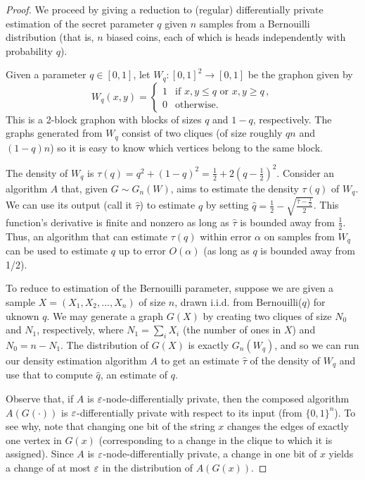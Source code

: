 \begin{proof} We proceed by giving a reduction to (regular)
  differentially private estimation of the secret parameter $q$ given
  $n$ samples from a Bernouilli distribution (that is, $n$ biased
  coins, each of which is heads independently with probability $q$). 

  Given a parameter $q\in [0,1]$, let $W_q:[0,1]^2\to [0,1]$ be the
  graphon given by 
  $$W_q(x,y) =
  \begin{cases}
    1 & \text{if } x, y \leq q \text{ or } x,y \geq q\, , \\
    0 & \text{otherwise.}
  \end{cases}$$
  This is a 2-block graphon with blocks of sizes $q$ and $1-q$,
  respectively. The graphs generated from $W_q$ consist of two
  cliques (of size roughly $qn$ and $(1-q)n$) so it is easy to know
  which vertices belong to the same block. 

  The density of $W_q$ is $\tau(q)= 
  q^2+ (1-q)^2 = \frac 1 2 + 2 (q-\frac 1 2)^2$. Consider an
  algorithm $A$ that, given $G\sim G_n(W)$, aims to estimate the density $\tau(q)$
  of $W_q$. We can use its output (call it $\hat \tau$) to estimate $q$ by
  setting $\hat q = \frac 1 2 - \sqrt{\frac{\hat \tau - \frac 1
      2}{2}}$. This function's derivative is finite and nonzero as
  long as $\hat \tau$ is bounded away from $\frac 1 2$. Thus, an
  algorithm that can estimate $\tau(q)$ within error $\alpha$ on samples
  from $W_q$ can be used to estimate $q$ up to error $O(\alpha)$ (as
  long as $q$ is bounded away from 1/2). 

  To reduce to estimation of the Bernouilli parameter, suppose we are
  given a sample $X = (X_1,X_2,...,X_n)$ of size  $n$, drawn
  i.i.d. from Bernouilli($q$) for uknown $q$. We may generate a graph $G(X)$
  by creating two cliques of size $N_0$ and $N_1$, respectively, where
  $N_1 = \sum_i X_i$ (the number of ones in $X$) and $N_0 =
  n-N_1$. The distribution of $G(X)$ is exactly $G_n(W_q)$, and so we
  can run our density estimation algorithm $A$ to get an estimate $\hat
  \tau$ of the density of $W_q$ and use that to compute $\hat q$, an
  estimate of $q$. 

  Observe that, if $A$ is $\varepsilon$-node-differentially private, then the
  composed algorithm
  $A(G(\cdot))$ is $\varepsilon$-differentially private with respect to its
  input (from
  $ \{0,1\}^n$). To see why, note that changing one bit of the string $x$
  changes the edges of exactly one vertex in $G(x)$ (corresponding to
  a change in the clique to which it is assigned). Since $A$ is
  $\varepsilon$-node-differentially private, a change in one bit of $x$
  yields a change of at most $\varepsilon$ in the distribution of
  $A(G(x))$. 


\end{proof}
